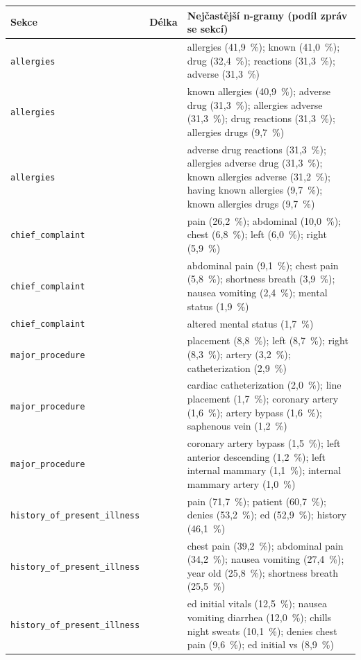 \begin{tabular}{>{\raggedright\arraybackslash}p{}>{\centering\arraybackslash}p{}>{\raggedright\arraybackslash}p{}}
\toprule
Sekce & Délka & Nejčastější n-gramy (podíl zpráv se sekcí)\\
\midrule
\texttt{allergies} & 1 & allergies (41,9 \%); known (41,0 \%); drug (32,4 \%); reactions (31,3 \%); adverse (31,3 \%)\\
\texttt{allergies} & 2 & known allergies (40,9 \%); adverse drug (31,3 \%); allergies adverse (31,3 \%); drug reactions (31,3 \%); allergies drugs (9,7 \%)\\
\texttt{allergies} & 3 & adverse drug reactions (31,3 \%); allergies adverse drug (31,3 \%); known allergies adverse (31,2 \%); having known allergies (9,7 \%); known allergies drugs (9,7 \%)\\
\texttt{chief\_complaint} & 1 & pain (26,2 \%); abdominal (10,0 \%); chest (6,8 \%); left (6,0 \%); right (5,9 \%)\\
\texttt{chief\_complaint} & 2 & abdominal pain (9,1 \%); chest pain (5,8 \%); shortness breath (3,9 \%); nausea vomiting (2,4 \%); mental status (1,9 \%)\\
\texttt{chief\_complaint} & 3 & altered mental status (1,7 \%)\\
\texttt{major\_procedure} & 1 & placement (8,8 \%); left (8,7 \%); right (8,3 \%); artery (3,2 \%); catheterization (2,9 \%)\\
\texttt{major\_procedure} & 2 & cardiac catheterization (2,0 \%); line placement (1,7 \%); coronary artery (1,6 \%); artery bypass (1,6 \%); saphenous vein (1,2 \%)\\
\texttt{major\_procedure} & 3 & coronary artery bypass (1,5 \%); left anterior descending (1,2 \%); left internal mammary (1,1 \%); internal mammary artery (1,0 \%)\\
\texttt{history\_of\_present\_illness} & 1 & pain (71,7 \%); patient (60,7 \%); denies (53,2 \%); ed (52,9 \%); history (46,1 \%)\\
\texttt{history\_of\_present\_illness} & 2 & chest pain (39,2 \%); abdominal pain (34,2 \%); nausea vomiting (27,4 \%); year old (25,8 \%); shortness breath (25,5 \%)\\
\texttt{history\_of\_present\_illness} & 3 & ed initial vitals (12,5 \%); nausea vomiting diarrhea (12,0 \%); chills night sweats (10,1 \%); denies chest pain (9,6 \%); ed initial vs (8,9 \%)\\

\end{tabular}
